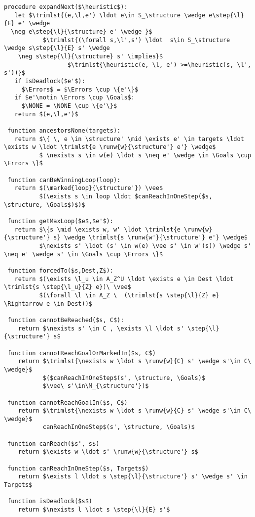 \begin{lstlisting}[language={pseudocode},label={lst:dcs.aux},caption={auxiliary procedures.},float=ht, frame=single]
 procedure expandNext($\heuristic$):
   let $\trimlst{(e,\l,e') \ldot e\in S_\structure \wedge e\step{\l}{E} e' \wedge   
  \neg e\step{\l}{\structure} e' \wedge }$ 
           $\trimlst{(\forall s,\l',s') \ldot  s\in S_\structure \wedge s\step{\l}{E} s' \wedge   
    \neg s\step{\l}{\structure} s' \implies}$ 
                  $\trimlst{\heuristic(e, \l, e') >=\heuristic(s, \l',   s'))}$
   if isDeadlock($e'$):
     $\Errors$ = $\Errors \cup \{e'\}$
   if $e'\notin \Errors \cup \Goals$:
     $\NONE = \NONE \cup \{e'\}$
   return $(e,\l,e')$
 
 function ancestorsNone(targets):
   return $\{ \, e \in \structure' \mid \exists e' \in targets \ldot \exists w \ldot \trimlst{e \runw{w}{\structure'} e'} \wedge$
          $ \nexists s \in w(e) \ldot s \neq e' \wedge \in \Goals \cup \Errors \}$
   
 function canBeWinningLoop(loop):
   return $(\marked{loop}{\structure'}) \vee$ 
          $(\exists s \in loop \ldot $canReachInOneStep($s, \structure, \Goals$)$)$
   
 function getMaxLoop($e$,$e'$):
   return $\{s \mid \exists w, w' \ldot \trimlst{e \runw{w}{\structure'} s} \wedge \trimlst{s \runw{w'}{\structure'} e'} \wedge$ 
          $\nexists s' \ldot (s' \in w(e) \vee s' \in w'(s)) \wedge s' \neq e' \wedge s' \in \Goals \cup \Errors \}$

 function forcedTo($s,Dest,Z$):
   return $(\exists \l_u \in A_Z^U \ldot \exists e \in Dest \ldot \trimlst{s \step{\l_u}{Z} e})\ \vee$
          $(\forall \l \in A_Z \  (\trimlst{s \step{\l}{Z} e} \Rightarrow e \in Dest))$    
    
 function cannotBeReached($s, C$):
    return $\nexists s' \in C , \exists \l \ldot s' \step{\l}{\structure'} s$
   
 function cannotReachGoalOrMarkedIn($s, C$)
    return $\trimlst{\nexists w \ldot s \runw{w}{C} s' \wedge s'\in C\ \wedge}$ 
           $($canReachInOneStep$(s', \structure, \Goals)$
           $\vee\ s'\in\M_{\structure'})$
           
 function cannotReachGoalIn($s, C$)
    return $\trimlst{\nexists w \ldot s \runw{w}{C} s' \wedge s'\in C\ \wedge}$ 
           canReachInOneStep$(s', \structure, \Goals)$
           
 function canReach($s', s$)
    return $\exists w \ldot s' \runw{w}{\structure'} s$

 function canReachInOneStep($s, Targets$)
    return $\exists l \ldot s \step{\l}{\structure'} s' \wedge s' \in Targets$

 function isDeadlock($s$)
    return $\nexists l \ldot s \step{\l}{E} s'$
\end{lstlisting}

